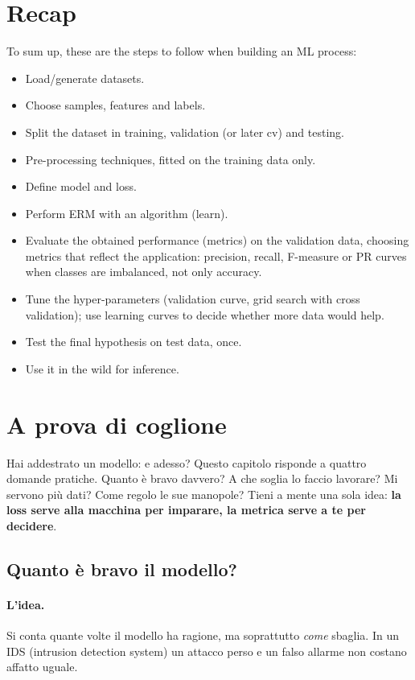 \section{Recap}
To sum up, these are the steps to follow when building an ML process:

\begin{itemize}
    \item Load/generate datasets.
    \item Choose samples, features and labels.
    \item Split the dataset in training, validation (or later cv) and testing.
    \item Pre-processing techniques, fitted on the training data only.
    \item Define model and loss.
    \item Perform ERM with an algorithm (learn).
    \item Evaluate the obtained performance (metrics) on the validation data, choosing metrics that reflect the application: precision, recall, F-measure or PR curves when classes are imbalanced, not only accuracy.
    \item Tune the hyper-parameters (validation curve, grid search with cross validation); use learning curves to decide whether more data would help.
    \item Test the final hypothesis on test data, once.
    \item Use it in the wild for inference.
\end{itemize}



\section{A prova di coglione}
Hai addestrato un modello: e adesso? Questo capitolo risponde a quattro domande pratiche. Quanto è bravo davvero? A che soglia lo faccio lavorare? Mi servono più dati? Come regolo le sue manopole? Tieni a mente una sola idea: \textbf{la loss serve alla macchina per imparare, la metrica serve a te per decidere}.

\subsection{Quanto è bravo il modello?}
\paragraph*{L'idea.} Si conta quante volte il modello ha ragione, ma soprattutto \emph{come} sbaglia. In un IDS (intrusion detection system) un attacco perso e un falso allarme non costano affatto uguale.

